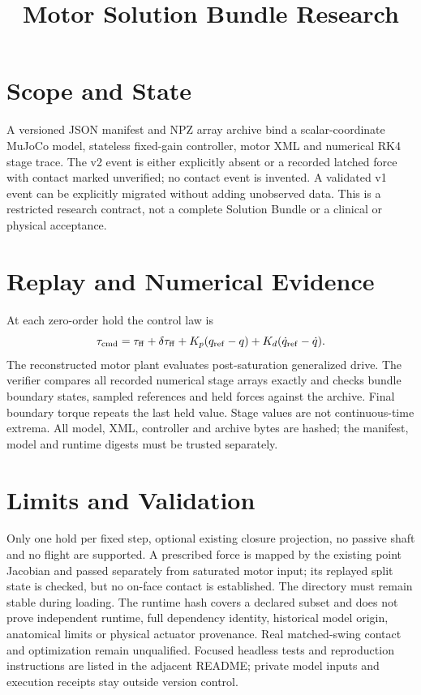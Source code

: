 \documentclass{article}
\title{Motor Solution Bundle Research}
\begin{document}
\maketitle
\section{Scope and State}
A versioned JSON manifest and NPZ array archive bind a scalar-coordinate
MuJoCo model, stateless fixed-gain controller, motor XML and numerical RK4
stage trace. The v2 event is either explicitly absent or a recorded latched force
with contact marked unverified; no contact event is invented. A validated v1 event can be explicitly migrated without adding
unobserved data. This is a restricted research contract, not a complete
Solution Bundle or a clinical or physical acceptance.
\section{Replay and Numerical Evidence}
At each zero-order hold the control law is
\[\tau_{\rm cmd}=\tau_{\rm ff}+\delta\tau_{\rm ff}
+K_p(q_{\rm ref}-q)+K_d(\dot q_{\rm ref}-\dot q).\]
The reconstructed motor plant evaluates post-saturation generalized drive.
The verifier compares all recorded numerical stage arrays exactly and checks
bundle boundary states, sampled references and held forces against the
archive. Final boundary torque repeats the last held value. Stage values are
not continuous-time extrema. All model, XML, controller and archive bytes
are hashed; the manifest, model and runtime digests must be trusted separately.
\section{Limits and Validation}
Only one hold per fixed step, optional existing closure projection, no passive
shaft and no flight are supported. A prescribed force is mapped by the
existing point Jacobian and passed separately from saturated motor input; its
replayed split state is checked, but no on-face contact is established. The directory must remain stable during loading. The
runtime hash covers a declared subset and does not prove independent runtime,
full dependency identity, historical model origin, anatomical limits or
physical actuator provenance. Real matched-swing contact and optimization
remain unqualified. Focused headless tests and reproduction instructions are
listed in the adjacent README; private model inputs and execution receipts stay
outside version control.
\end{document}
